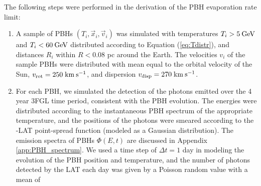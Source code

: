 The following steps were performed in the derivation of the PBH evaporation rate limit:
\vspace{-2mm}
\begin{enumerate}
\item
\label{item:make_pbhs}
A sample of PBHs $(T_i, \vec{x}_i, \vec{v}_i)$ was simulated with temperatures $T_i>5\: {\rm GeV}$ and $T_i<60\: {\rm GeV}$ distributed according to Equation (\ref{eq:Tdistr}), and distances $R_i$ within $R < 0.08$ pc around the Earth. 
The velocities $v_i$ of the sample PBHs were distributed with mean equal to the orbital velocity of the Sun, 
$v_{\rm rot} = 250\; {\rm km\: s^{-1}}$,
and dispersion $v_{\rm disp} = 270\; {\rm km\: s^{-1}}$.
\item
For each PBH, we simulated the detection of the photons emitted over the 4 year 3FGL time period, consistent with the PBH evolution. The energies were distributed according to the instantaneous PBH spectrum of the appropriate temperature, and the positions of the photons were smeared according to the 
\Fermi-LAT point-spread function (modeled as a Gaussian distribution).
The emission spectra of PBHs $\Phi(E,t)$ are discussed in Appendix \ref{app:PBH_spectrum}. 
We used a time step of $\Delta t = 1$ day in modeling the evolution of the PBH position and temperature, 
and the number of photons detected by the \Fermi LAT each day was given by a Poisson random value with a mean of 


\end{enumerate}
